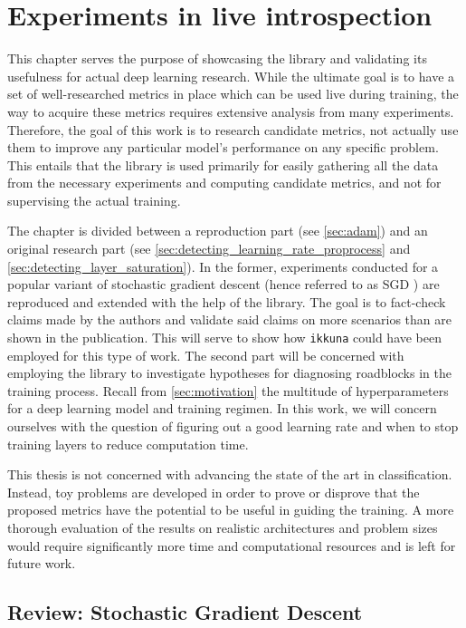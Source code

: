 \chapter{Experiments in live introspection}
\label{ch:experiments}

This chapter serves the purpose of showcasing the library and validating its
usefulness for actual deep learning research. While the ultimate goal is to have
a set of well-researched metrics in place which can be used live during
training, the way to acquire these metrics requires extensive analysis from many
experiments. Therefore, the goal of this work is to research candidate metrics,
not actually use them to improve any particular model's performance on any
specific problem. This entails that the library is used primarily for easily
gathering all the data from the necessary experiments and computing candidate
metrics, and not for supervising the actual training.

The chapter is divided between a reproduction part (see
\cref{sec:adam}) and an original research part (see
\cref{sec:detecting_learning_rate_proprocess} and
\cref{sec:detecting_layer_saturation}). In the former, experiments conducted
for a popular variant of stochastic gradient descent (hence referred to as SGD
) are reproduced and extended with
the help of the library. The goal is to fact-check claims made by the authors
and validate said claims on more scenarios than are shown in the
publication. This will serve to show how \texttt{ikkuna} could have been
employed for this type of work. The second part will be concerned with employing
the library to investigate hypotheses for diagnosing roadblocks in the training
process. Recall from \cref{sec:motivation} the multitude of hyperparameters
for a deep learning model and training regimen. In this work, we will concern
ourselves with the question of figuring out a good learning rate and when to
stop training layers to reduce computation time.

This thesis is not concerned with advancing the state of the art in
classification. Instead, toy problems are developed in order to prove or
disprove that the proposed metrics have the potential to be useful in guiding
the training. A more thorough evaluation of the results on realistic
architectures and problem sizes would require significantly more time and
computational resources and is left for future work.

\section{Review: Stochastic Gradient Descent}%
\label{sec:review_stochastic_gradient_descent}

